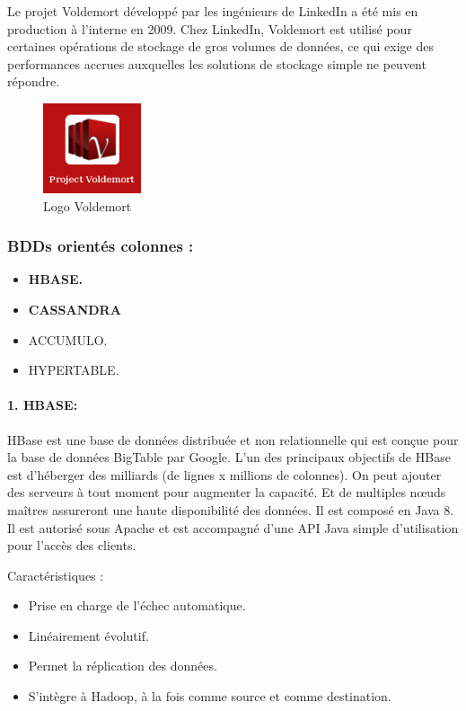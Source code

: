 Le projet Voldemort développé par les ingénieurs de LinkedIn a été mis en production à l’interne en 2009. Chez LinkedIn, Voldemort est utilisé pour certaines opérations de stockage de gros volumes de données, ce qui exige des performances accrues auxquelles les solutions de stockage simple ne peuvent répondre.

\begin{figure}[h]
	\centering
    \includegraphics[scale=0.5]{img/4.8}
    \caption{Logo Voldemort}
\end{figure}

\subsubsection{BDDs orientés colonnes :}

\begin{itemize}[label=\textbullet]
\item \textbf{HBASE.}
\item \textbf{CASSANDRA}
\item ACCUMULO.
\item HYPERTABLE.
\end{itemize}

\paragraph{1. HBASE:}
HBase est une base de données distribuée et non relationnelle qui est conçue pour la base de données BigTable par Google. L'un des principaux objectifs de HBase est d'héberger des milliards (de lignes x millions de colonnes). On peut ajouter des serveurs à tout moment pour augmenter la capacité. Et de multiples nœuds maîtres assureront une haute disponibilité des données. Il est composé en Java 8. Il est autorisé sous Apache et est accompagné d'une API Java simple d'utilisation pour l'accès des clients.

Caractéristiques :
\begin{itemize}[label=]
\item Prise en charge de l'échec automatique.
\item Linéairement évolutif.
\item Permet la réplication des données.
\item S'intègre à Hadoop, à la fois comme source et comme destination.
\end{itemize}

